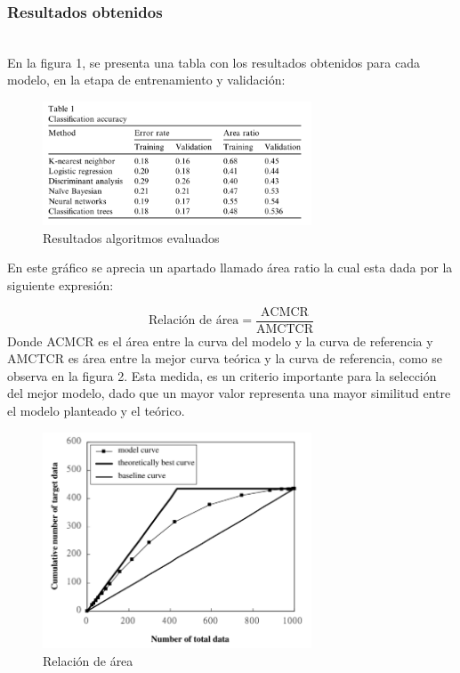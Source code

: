 \documentclass[conference]{IEEEtran}
\begin{document}
\subsubsection{Resultados obtenidos}\hfill\\
En la figura 1, se presenta una tabla con los resultados obtenidos para cada modelo, en la etapa de entrenamiento y validación:

\begin{center}
    \begin{figure}[H]
        \hfill
            \includegraphics[width=8cm]{resultadosArticulo1.png}\hspace*{\fill}
    \caption{Resultados algoritmos evaluados}
    \label{fig:login}
    \end{figure}  
\end{center}

En este gráfico se aprecia un apartado llamado área ratio la cual esta dada por la siguiente expresión: \newline

\[
 \text{Relación de área} = \frac{\text{ACMCR}}{\text{AMCTCR}}
\]\newline
Donde ACMCR es el área entre la curva del modelo y la curva de referencia y AMCTCR es área entre la mejor curva teórica y la curva de referencia, como se observa en la figura 2. Esta medida, es un criterio importante para la selección del mejor modelo, dado que un mayor valor representa una mayor similitud entre el modelo planteado y el teórico.
\begin{center}
    \begin{figure}[H]
        \hfill
            \includegraphics[width=8cm]{areaRatio.png}\hspace*{\fill}
    \caption{Relación de  área}
    \label{fig:login}
    \end{figure}  
\end{center}
\end{document}
